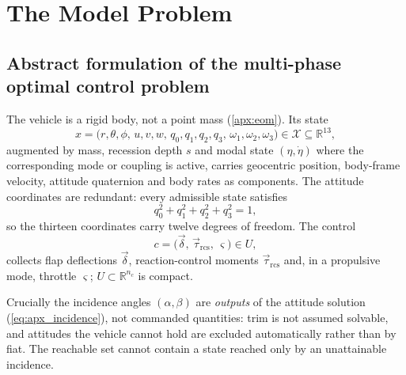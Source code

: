 
\section{The Model Problem}
\label{sec:model}

\subsection{Abstract formulation of the multi-phase optimal control problem}
\label{sub:abstract_formulation}

The vehicle is a rigid body, not a point mass (\cref{apx:eom}). Its state
\begin{equation}
\label{eq:model_state}
x=\bigl(r,\theta,\phi,\,u,v,w,\,q_0,q_1,q_2,q_3,\,\omega_1,\omega_2,\omega_3\bigr)\in\mathcal X\subseteq\mathbb R^{13},
\end{equation}
augmented by mass, recession depth $s$ and modal state $(\eta,\dot\eta)$
where the corresponding mode or coupling is active, carries geocentric
position, body-frame velocity, attitude quaternion and body rates as
components.
The attitude coordinates are redundant: every admissible state satisfies
\begin{equation}
\label{eq:model_quaternion_norm}
q_0^{2}+q_1^{2}+q_2^{2}+q_3^{2}=1,
\end{equation}
so the thirteen coordinates carry twelve degrees of freedom.
The control
\begin{equation}
\label{eq:model_control}
c=\bigl(\vec\delta,\,\vec\tau_{\mathrm{rcs}},\,\varsigma\bigr)\in U,
\end{equation}
collects flap deflections $\vec\delta$, reaction-control moments
$\vec\tau_{\mathrm{rcs}}$ and, in a propulsive mode, throttle $\varsigma$;
$U\subset\mathbb R^{n_c}$ is compact. 

Crucially the incidence angles
$(\alpha,\beta)$ are \emph{outputs} of the attitude solution
(\cref{eq:apx_incidence}), not commanded quantities: trim is not assumed
solvable, and attitudes the vehicle cannot hold are excluded automatically
rather than by fiat. The reachable set cannot contain a state reached only by an
unattainable incidence.

